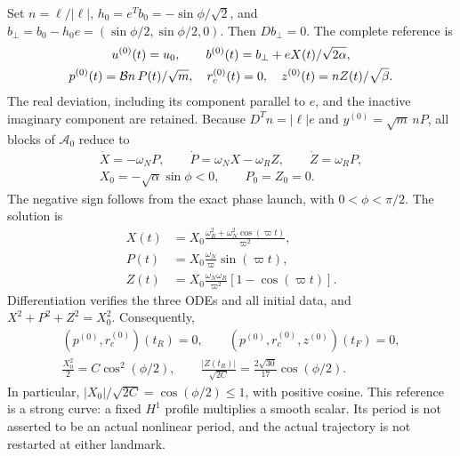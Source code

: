 Set $n=\ell/|\ell|$, $h_0=e^Tb_0=-\sin\phi/\sqrt2$, and
$b_\perp=b_0-h_0e=(\sin\phi/2,\sin\phi/2,0)$.
Then $Db_\perp=0$. The complete reference is
\begin{equation}\label{eq:embedding}%
\begin{gathered}
 u^{(0)}(t)=u_0,\qquad b^{(0)}(t)=b_\perp+eX(t)/\sqrt{2\alpha},\\
 p^{(0)}(t)=\B n\,P(t)/\sqrt m,\quad
 r_c^{(0)}(t)=0,\quad z^{(0)}(t)=nZ(t)/\sqrt\beta .
\end{gathered}
\end{equation}
The real deviation, including its component parallel to $e$, and the inactive imaginary component are retained. Because $D^Tn=|\ell|e$ and
$y^{(0)}=\sqrt m\,nP$, all blocks of $\mathcal A_0$ reduce to
\begin{equation}\label{eq:oscillator}%
\begin{gathered}
 \dot X=-\omega_NP,\qquad
 \dot P=\omega_NX-\omega_RZ,\qquad \dot Z=\omega_RP,\\
 X_0=-\sqrt\alpha\sin\phi<0,\qquad P_0=Z_0=0 .
\end{gathered}
\end{equation}
The negative sign follows from the exact phase launch, with $0<\phi<\pi/2$.
The solution is
\begin{equation}\label{eq:solution}%
\begin{aligned}
 X(t)&=X_0\frac{\omega_R^2+\omega_N^2\cos(\varpi t)}{\varpi^2},\\
 P(t)&=X_0\frac{\omega_N}{\varpi}\sin(\varpi t),\\
 Z(t)&=X_0\frac{\omega_N\omega_R}{\varpi^2}
                   [1-\cos(\varpi t)] .
\end{aligned}
\end{equation}
Differentiation verifies the three ODEs and all initial data, and
$X^2+P^2+Z^2=X_0^2$. Consequently,
\begin{equation}\label{eq:referencezeros}%
\begin{gathered}
 (p^{(0)},r_c^{(0)})(t_R)=0,\qquad
 (p^{(0)},r_c^{(0)},z^{(0)})(t_F)=0,\\
 \frac{X_0^2}{2}=C\cos^2(\phi/2),\qquad
 \frac{|Z(t_R)|}{\sqrt{2C}}
 =\frac{2\sqrt{30}}{17}\cos(\phi/2).
\end{gathered}
\end{equation}
In particular, $|X_0|/\sqrt{2C}=\cos(\phi/2)\le1$, with positive cosine. This reference is a strong curve: a fixed $H^1$ profile multiplies a smooth scalar. Its period is not asserted to be an actual nonlinear period, and the actual trajectory is not restarted at either landmark.
